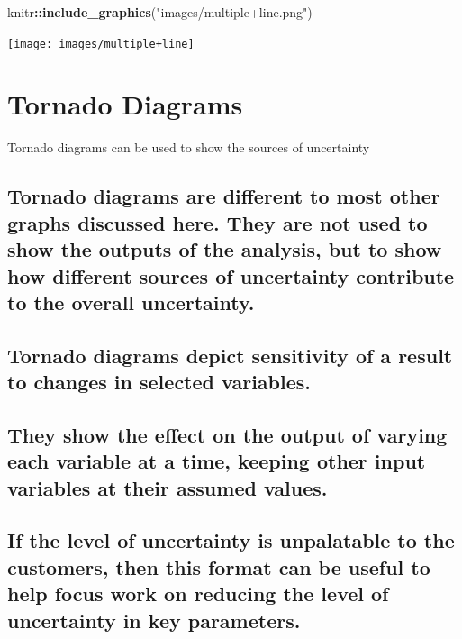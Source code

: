 \documentclass[]{book}
\newenvironment{Shaded}{\begin{snugshade}}{\end{snugshade}}
\newcommand{\KeywordTok}[1]{\textcolor[rgb]{0.13,0.29,0.53}{\textbf{#1}}}
\newcommand{\StringTok}[1]{\textcolor[rgb]{0.31,0.60,0.02}{#1}}
\newcommand{\OperatorTok}[1]{\textcolor[rgb]{0.81,0.36,0.00}{\textbf{#1}}}
\newcommand{\NormalTok}[1]{#1}
\begin{document}
\begin{Shaded}
\begin{Highlighting}[]
\NormalTok{knitr}\OperatorTok{::}\KeywordTok{include_graphics}\NormalTok{(}\StringTok{"images/multiple+line.png"}\NormalTok{)}
\end{Highlighting}
\end{Shaded}

\begin{center}\texttt{[image: images/multiple+line]} \end{center}

\section{Tornado Diagrams}\label{tornado-diagrams}

Tornado diagrams can be used to show the sources of uncertainty

\subsection{Tornado diagrams are different to most other graphs
discussed here. They are not used to show the outputs of the analysis,
but to show how different sources of uncertainty contribute to the
overall
uncertainty.}\label{tornado-diagrams-are-different-to-most-other-graphs-discussed-here.-they-are-not-used-to-show-the-outputs-of-the-analysis-but-to-show-how-different-sources-of-uncertainty-contribute-to-the-overall-uncertainty.}

\subsection{Tornado diagrams depict sensitivity of a result to changes
in selected
variables.}\label{tornado-diagrams-depict-sensitivity-of-a-result-to-changes-in-selected-variables.}

\subsection{They show the effect on the output of varying each variable
at a time, keeping other input variables at their assumed
values.}\label{they-show-the-effect-on-the-output-of-varying-each-variable-at-a-time-keeping-other-input-variables-at-their-assumed-values.}

\subsection{If the level of uncertainty is unpalatable to the customers,
then this format can be useful to help focus work on reducing the level
of uncertainty in key
parameters.}\label{if-the-level-of-uncertainty-is-unpalatable-to-the-customers-then-this-format-can-be-useful-to-help-focus-work-on-reducing-the-level-of-uncertainty-in-key-parameters.}
\end{document}
